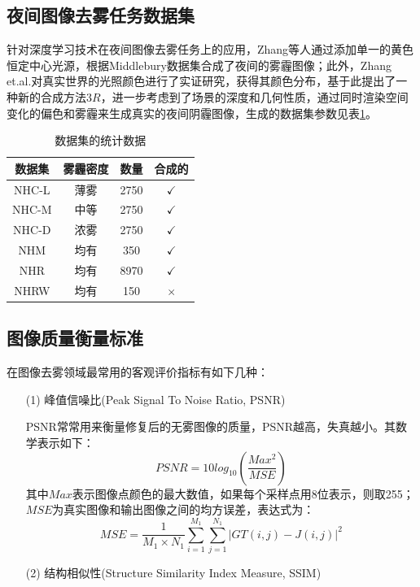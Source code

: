 \begin{multicols}{2}
\subsection{夜间图像去雾任务数据集}
针对深度学习技术在夜间图像去雾任务上的应用，Zhang等人\cite{5}通过添加单一的黄色恒定中心光源，根据Middlebury数据集\cite{13}合成了夜间的雾霾图像；此外，Zhang et.al.\cite{9}对真实世界的光照颜色进行了实证研究，获得其颜色分布，基于此提出了一种新的合成方法$3R$，进一步考虑到了场景的深度和几何性质，通过同时渲染空间变化的偏色和雾霾来生成真实的夜间阴霾图像，生成的数据集参数见表\ref{tb:8}。
\begin{table}[H]
	\footnotesize
	\renewcommand{\arraystretch}{1.0}
	\centering
	\caption{\centering 数据集的统计数据}\label{tb:8}
	\begin{tabular}{cccc}
		\toprule[1.5pt]数据集
		&雾霾密度&数量&合成的\\
		\midrule[1pt]
		 NHC-L& 薄雾 &2750&$\checkmark$\\
		 NHC-M& 中等&2750& $\checkmark$ \\
		 NHC-D& 浓雾&2750& $\checkmark$ \\
		 NHM& 均有&350& $\checkmark$ \\
		 NHR& 均有&8970& $\checkmark$ \\
		 NHRW& 均有&150& $\times$ \\
		\bottomrule[1.5pt]
	\end{tabular}
\end{table}

\subsection{图像质量衡量标准}
在图像去雾领域最常用的客观评价指标有如下几种：
\begin{enumerate}
	\item[(1)] 峰值信噪比(Peak Signal To Noise
	Ratio, PSNR)\cite{15}
	
	PSNR常常用来衡量修复后的无雾图像的质量，PSNR越高，失真越小。其数学表示如下：
	\begin{equation}
		PSNR=10log_{10}(\frac{Max^2}{MSE})
	\end{equation}
	其中$Max$表示图像点颜色的最大数值，如果每个采样点用8位表示，则取255；$MSE$为真实图像和输出图像之间的均方误差，表达式为：
	\begin{equation}
		MSE=\frac{1}{M_1\times N_1}\sum_{i=1}^{M_1}\sum_{j=1}^{N_1}|GT(i,j)-J(i,j)|^2
	\end{equation}
	\item[(2)]结构相似性(Structure Similarity Index Measure, SSIM)\cite{14}
	

\end{enumerate}
\end{multicols}
